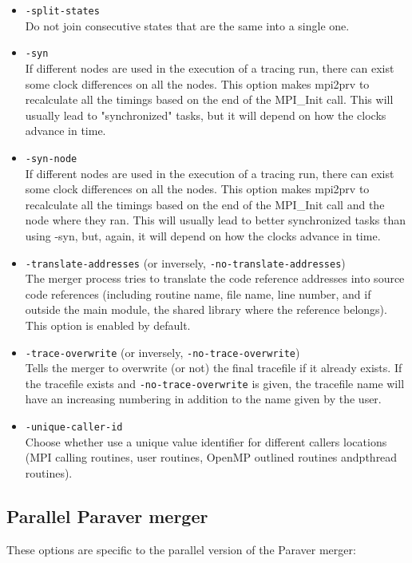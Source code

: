 \begin{itemize}
 \item {\tt -split-states}\\
 Do not join consecutive states that are the same into a single one.
 \item {\tt -syn}\\
 If different nodes are used in the execution of a tracing run, there can exist some clock differences on all the nodes. This option makes mpi2prv to recalculate all the timings based on the end of the MPI\_Init call. This will usually lead to "synchronized" tasks, but it will depend on how the clocks advance in time.
 \item {\tt -syn-node}\\
 If different nodes are used in the execution of a tracing run, there can exist some clock differences on all the nodes. This option makes mpi2prv to recalculate all the timings based on the end of the MPI\_Init call and the node where they ran. This will usually lead to better synchronized tasks than using -syn, but, again, it will depend on how the clocks advance in time.
 \item {\tt -translate-addresses} (or inversely, {\tt -no-translate-addresses})\\
 The merger process tries to translate the code reference addresses into source code references (including routine name, file name, line number, and if outside the main module, the shared library where the reference belongs). This option is enabled by default.
 \item {\tt -trace-overwrite} (or inversely, {\tt -no-trace-overwrite})\\
 Tells the merger to overwrite (or not) the final tracefile if it already exists. If the tracefile exists and {\tt -no-trace-overwrite} is given, the tracefile name will have an increasing numbering in addition to the name given by the user.
 \item {\tt -unique-caller-id}\\
 Choose whether use a unique value identifier for different callers locations (MPI calling routines, user routines, OpenMP outlined routines andpthread routines).
\end{itemize}

\subsection{Parallel Paraver merger}

These options are specific to the parallel version of the Paraver merger:

